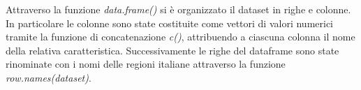 Attraverso la funzione \textit{data.frame()} si è organizzato il dataset in righe e 
colonne. In particolare le colonne sono state costituite come vettori di valori 
numerici tramite la funzione di concatenazione \textit{c()}, attribuendo a ciascuna 
colonna il nome della relativa caratteristica. Successivamente le righe del 
dataframe sono state rinominate con i nomi delle regioni italiane attraverso 
la funzione \textit{row.names(dataset)}.




\newpage